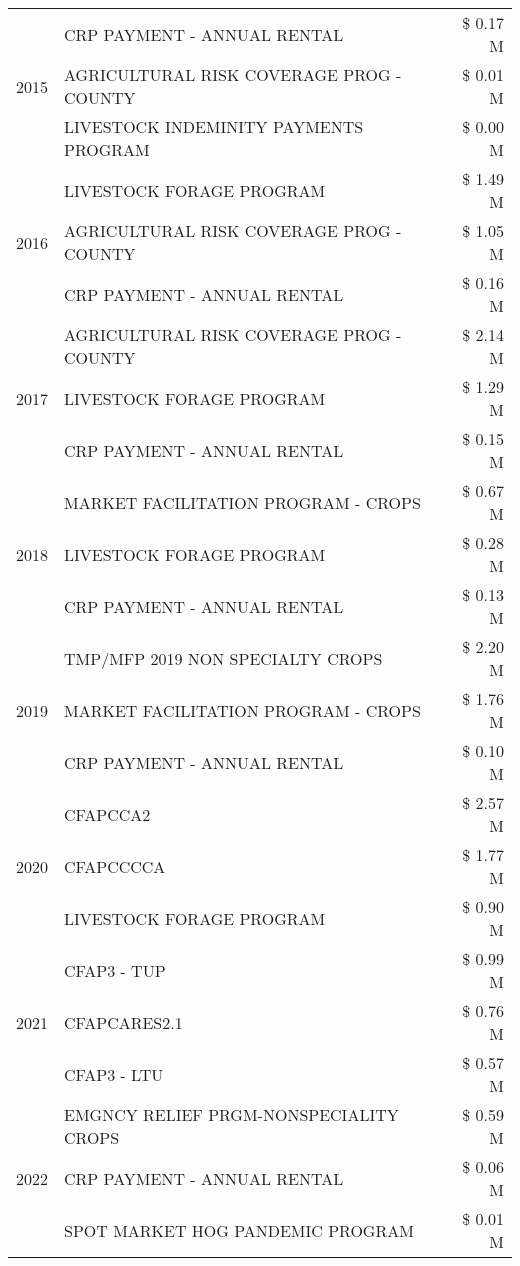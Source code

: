 \begin{tabular}{llr}
\multirow[t]{3}{*}{2015} & CRP PAYMENT - ANNUAL RENTAL & \$ 0.17 M \\
 & AGRICULTURAL RISK COVERAGE PROG - COUNTY & \$ 0.01 M \\
 & LIVESTOCK INDEMINITY PAYMENTS PROGRAM & \$ 0.00 M \\
\cline{1-3}
\multirow[t]{3}{*}{2016} & LIVESTOCK FORAGE PROGRAM & \$ 1.49 M \\
 & AGRICULTURAL RISK COVERAGE PROG - COUNTY & \$ 1.05 M \\
 & CRP PAYMENT - ANNUAL RENTAL & \$ 0.16 M \\
\cline{1-3}
\multirow[t]{3}{*}{2017} & AGRICULTURAL RISK COVERAGE PROG - COUNTY & \$ 2.14 M \\
 & LIVESTOCK FORAGE PROGRAM & \$ 1.29 M \\
 & CRP PAYMENT - ANNUAL RENTAL & \$ 0.15 M \\
\cline{1-3}
\multirow[t]{3}{*}{2018} & MARKET FACILITATION PROGRAM - CROPS & \$ 0.67 M \\
 & LIVESTOCK FORAGE PROGRAM & \$ 0.28 M \\
 & CRP PAYMENT - ANNUAL RENTAL & \$ 0.13 M \\
\cline{1-3}
\multirow[t]{3}{*}{2019} & TMP/MFP 2019 NON SPECIALTY CROPS & \$ 2.20 M \\
 & MARKET FACILITATION PROGRAM - CROPS & \$ 1.76 M \\
 & CRP PAYMENT - ANNUAL RENTAL & \$ 0.10 M \\
\cline{1-3}
\multirow[t]{3}{*}{2020} & CFAPCCA2 & \$ 2.57 M \\
 & CFAPCCCCA & \$ 1.77 M \\
 & LIVESTOCK FORAGE PROGRAM & \$ 0.90 M \\
\cline{1-3}
\multirow[t]{3}{*}{2021} & CFAP3 - TUP & \$ 0.99 M \\
 & CFAPCARES2.1 & \$ 0.76 M \\
 & CFAP3 - LTU & \$ 0.57 M \\
\cline{1-3}
\multirow[t]{3}{*}{2022} & EMGNCY RELIEF PRGM-NONSPECIALITY CROPS & \$ 0.59 M \\
 & CRP PAYMENT - ANNUAL RENTAL & \$ 0.06 M \\
 & SPOT MARKET HOG PANDEMIC PROGRAM & \$ 0.01 M \\
\cline{1-3}
\bottomrule
\end{tabular}
